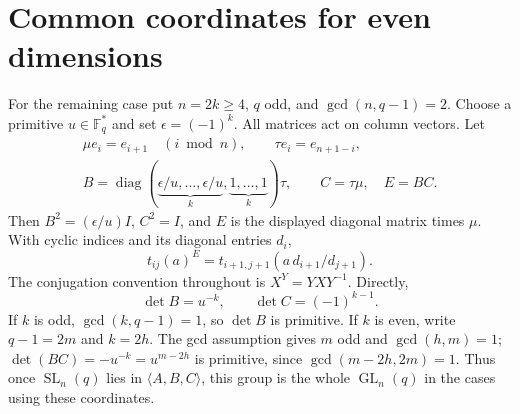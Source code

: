 \documentclass[11pt]{article}
\newcommand{\GL}{\operatorname{GL}}\newcommand{\SL}{\operatorname{SL}}
\newcommand{\diag}{\operatorname{diag}}\newcommand{\F}{\mathbb F}
\begin{document}
\section{Common coordinates for even dimensions}
For the remaining case put $n=2k\geq4$, $q$ odd, and
$\gcd(n,q-1)=2$. Choose a primitive $u\in\F_q^*$ and set
$\epsilon=(-1)^k$. All matrices act on column vectors. Let
\begin{gather*}
 \mu e_i=e_{i+1}\quad(i\bmod n),\qquad \tau e_i=e_{n+1-i},\\
 B=\diag(\underbrace{\epsilon/u,\ldots,\epsilon/u}_{k},
                    \underbrace{1,\ldots,1}_{k})\tau,
 \qquad C=\tau\mu,\quad E=BC.
\end{gather*}
Then $B^2=(\epsilon/u)I$, $C^2=I$, and $E$ is the displayed diagonal
matrix times $\mu$. With cyclic indices and its diagonal entries $d_i$,
\begin{equation}\label{transport}
 t_{ij}(a)^E=t_{i+1,j+1}(a\,d_{i+1}/d_{j+1}).
\end{equation}
The conjugation convention throughout is $X^Y=YXY^{-1}$.
Directly,
\[\det B=u^{-k},\qquad\det C=(-1)^{k-1}.\]
If $k$ is odd, $\gcd(k,q-1)=1$, so $\det B$ is primitive. If $k$ is
even, write $q-1=2m$ and $k=2h$. The gcd assumption gives $m$ odd and
$\gcd(h,m)=1$; $\det(BC)=-u^{-k}=u^{m-2h}$ is primitive, since
$\gcd(m-2h,2m)=1$. Thus once $\SL_n(q)$ lies in $\langle A,B,C\rangle$,
this group is the whole $\GL_n(q)$ in the cases using these coordinates.
\end{document}
